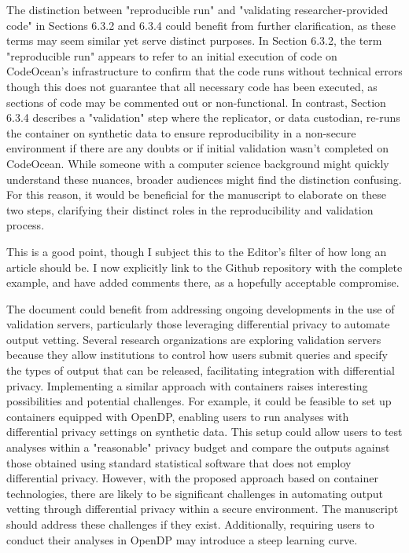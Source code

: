 \begin{referee}


    The distinction between "reproducible run" and "validating researcher-provided code" in Sections 6.3.2 and 6.3.4 could benefit from further clarification, as these terms may seem similar yet serve distinct purposes.  In Section 6.3.2, the term "reproducible run" appears to refer to an initial execution of code on CodeOcean's infrastructure to confirm that the code runs without technical errors though this does not guarantee that all necessary code has been executed, as sections of code may be commented out or non-functional.  In contrast, Section 6.3.4 describes a "validation" step where the replicator, or data custodian, re-runs the container on synthetic data to ensure reproducibility in a non-secure environment if there are any doubts or if initial validation wasn't completed on CodeOcean.  While someone with a computer science background might quickly understand these nuances, broader audiences might find the distinction confusing. For this reason, it would be beneficial for the manuscript to elaborate on these two steps, clarifying their distinct roles in the reproducibility and validation process. 
\end{referee}

\begin{response}
    This is a good point, though I subject this to the Editor's filter of how long an article should be. I now explicitly link to the Github repository with the complete example, and have added comments there, as a hopefully acceptable compromise.
\end{response}

\begin{referee}

    The document could benefit from addressing ongoing developments in the use of validation servers, particularly those leveraging differential privacy to automate output vetting.  Several research organizations are exploring validation servers because they allow institutions to control how users submit queries and specify the types of output that can be released, facilitating integration with differential privacy.  Implementing a similar approach with containers raises interesting possibilities and potential challenges. For example, it could be feasible to set up containers equipped with OpenDP, enabling users to run analyses with differential privacy settings on synthetic data.  This setup could allow users to test analyses within a "reasonable" privacy budget and compare the outputs against those obtained using standard statistical software that does not employ differential privacy. However, with the proposed approach based on container technologies, there are likely to be significant challenges in automating output vetting through differential privacy within a secure environment. The manuscript should address these challenges if they exist.  Additionally, requiring users to conduct their analyses in OpenDP may introduce a steep learning curve. 
\end{referee}

